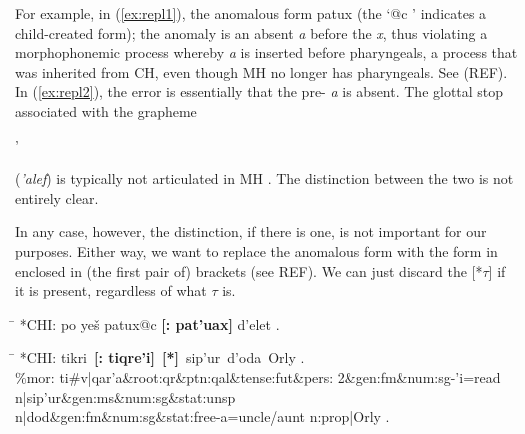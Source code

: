 For example, in (\ref{ex:repl1}), the anomalous 
form \textsf{patux} 
(the `\textsf{@c} ' indicates a child-created form); 
the anomaly is an absent \textit{a} before the \textit{x}, thus violating 
a morphophonemic process 
whereby \textit{a} is inserted before pharyngeals, a process that was inherited 
from \ac{CH}, even though \ac{MH} no longer has pharyngeals. See (REF).
In (\ref{ex:repl2}), the error is essentially that the pre-\textit{} 
\textit{a} is absent. The glottal stop
associated with the grapheme \begin{cjhebrew}'\end{cjhebrew} (\textit{'alef}) 
is typically not articulated in \ac{MH} \citep{montoya:2014}. The distinction
between the two is not entirely clear.

In any case, however, the distinction, if there is one, is not important for our  purposes. 
Either way, we want to replace the anomalous form with the form in enclosed in 
(the first pair of) brackets (see REF). We can just discard the \textsf{[*$\tau$]} if it is present, regardless of what $\tau$ is.

\begin{exe} 
\ex \begin{xlist} 
   \ex\label{ex:repl1} \begin{tabbing}  
	\hspace{0.6in} \= \hspace{5.5in} \kill
	\textsf{*\ac{CH}I:} \> \textsf{po ye\v{s} patux@c \textbf{[: pat\a'{u}ax]} d\a'{e}let .}
	\end{tabbing}
     \ex\label{ex:repl2} \begin{tabbing}
	\hspace{0.6in} \= \hspace{5.5in} \kill
	\textsf{*\ac{CH}I:} \> \textsf{tikri \,\textbf{[: tiqre\a'{i}]}\, \textbf{[*]}\, 
	sip\a'{u}r\, d\a'{o}da\, Orly .} \\
	\textsf{\%mor:} \> \textsf{ti\#v|qar\a'{a}\&root:qr\&ptn:qal\&tense:fut\&pers:		2\&gen:fm\&num:sg-\a'{i}=read} \\
                    \> \textsf{n|sip\a'{u}r\&gen:ms\&num:sg\&stat:unsp } \\
                    \> \textsf{n|dod\&gen:fm\&num:sg\&stat:free-a=uncle/aunt} \textsf{n:prop|Orly .}
	\end{tabbing}
   \end{xlist}
\end{exe}

